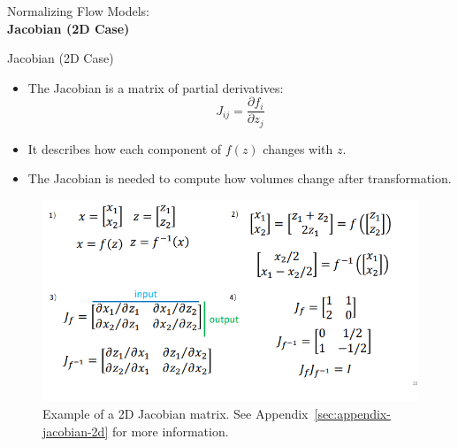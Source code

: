 \begin{frame}[allowframebreaks]{}
    \LARGE Normalizing Flow Models: \\[1.5ex] \textbf{Jacobian (2D Case)}
\end{frame}

\begin{frame}[allowframebreaks]{Jacobian (2D Case)}
\begin{itemize}
    \item The Jacobian is a matrix of partial derivatives:
    \[
    J_{ij} = \frac{\partial f_i}{\partial z_j}
    \]
    \item It describes how each component of $f(z)$ changes with $z$.
    \item The Jacobian is needed to compute how volumes change after transformation.
\end{itemize}

\framebreak

\begin{figure}
    \centering
    \includegraphics[height=0.8\textheight, width=\textwidth, keepaspectratio]{images/norm-flow/jacobian.png}
    \caption*{Example of a 2D Jacobian matrix. See Appendix~\ref{sec:appendix-jacobian-2d} for more information.}
\end{figure}
    
\end{frame}